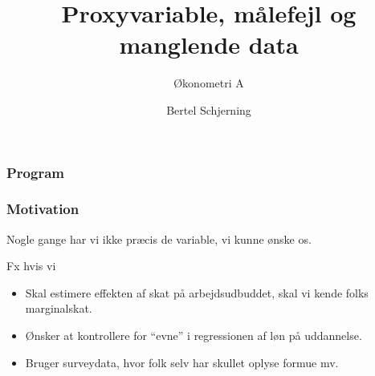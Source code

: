 \documentclass[aspectratio=43,t]{beamer}
\title[TALK]{\Large{Proxyvariable, målefejl og manglende data}}
\subtitle{Økonometri A}
\author{Bertel Schjerning}
\date{}
\begin{document}
 
\maketitle

\begin{frame}
\frametitle{Program}
	\tableofcontents
\end{frame}

\begin{frame}
\frametitle{Motivation}

	Nogle gange har vi ikke præcis de variable, vi kunne ønske os.
	
	Fx hvis vi
	\begin{itemize}
	\item Skal estimere effekten af skat på arbejdsudbuddet, skal vi kende folks marginalskat. 
	\item Ønsker at kontrollere for ``evne'' i regressionen af løn på uddannelse.
	\item Bruger surveydata, hvor folk selv har skullet oplyse formue mv.
	\end{itemize}
		
\end{frame}

\end{document}
